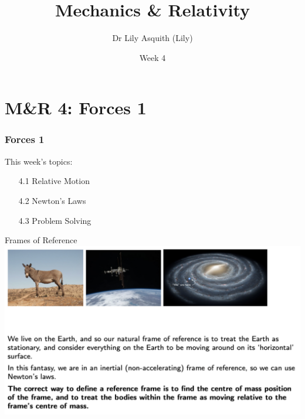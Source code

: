 


% 
\title[ Mechanics \& Relativity]{Mechanics \& Relativity}
\author[Dr Lily Asquith (Lily)]{ Dr Lily Asquith (Lily)}
\date[Week 4]{Week 4}





\begin{frame}
\titlepage
\end{frame} 



\section{M\&R 4: Forces 1}
\begin{frame}
\frametitle{Forces 1} 
\normalsize

This week's topics:\\[3ex]

\begin{itemize}
\item[4.1] Relative Motion\\[3ex]
\item[4.2] Newton's Laws\\[3ex]
\item[4.3] Problem Solving\\[3ex]
\end{itemize}
\end{frame} 
 

\begin{frame}{Frames of Reference}
\small
\includegraphics[scale=0.34]{frames-intro}
\vspace{10cm}
\end{frame}



